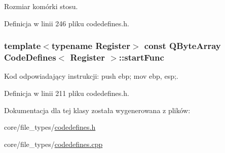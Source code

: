 Rozmiar komórki stosu. 



Definicja w linii 246 pliku codedefines.\-h.

\hypertarget{class_code_defines_ab0339e357461e07258de4e77d0c73c5c}{
\subsubsection[{start\-Func}]{\setlength{\rightskip}{0pt plus 5cm}template$<$typename Register$>$ const Q\-Byte\-Array {\bf Code\-Defines}$<$ Register $>$\-::start\-Func\hspace{0.3cm}{\ttfamily [static]}}}\label{class_code_defines_ab0339e357461e07258de4e77d0c73c5c}


Kod odpowiadający instrukcji\-: push ebp; mov ebp, esp;. 



Definicja w linii 211 pliku codedefines.\-h.



Dokumentacja dla tej klasy została wygenerowana z plików\-:\begin{DoxyCompactItemize}
\item 
core/file\-\_\-types/\hyperlink{codedefines_8h}{codedefines.\-h}\item 
core/file\-\_\-types/\hyperlink{codedefines_8cpp}{codedefines.\-cpp}\end{DoxyCompactItemize}
